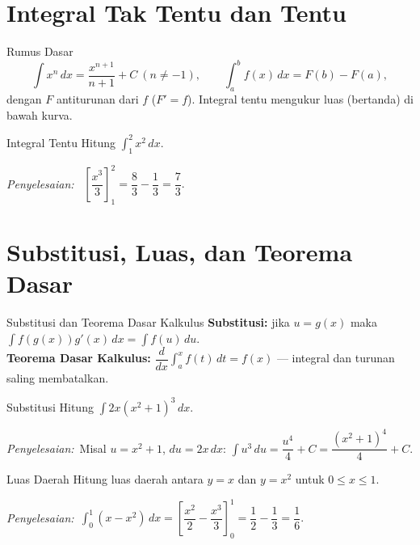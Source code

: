 \documentclass[11pt,a4paper]{report}
\theoremstyle{gaya}
\newcommand{\jawab}{\par\smallskip\noindent\textit{\textcolor{oranye}{Penyelesaian:}}\ }
\begin{document}
\section{Integral Tak Tentu dan Tentu}
\begin{konsep}{Rumus Dasar}
\[
\int x^n\,dx = \frac{x^{n+1}}{n+1}+C\ (n\neq-1), \qquad
\int_a^b f(x)\,dx = F(b)-F(a),
\]
dengan $F$ antiturunan dari $f$ ($F'=f$). Integral tentu mengukur luas (bertanda) di bawah kurva.
\end{konsep}

\begin{center}
\end{center}

\begin{contoh}{Integral Tentu}
Hitung $\displaystyle\int_1^2 x^2\,dx$.

\jawab
$\left[\dfrac{x^3}{3}\right]_1^2 = \dfrac{8}{3}-\dfrac{1}{3} = \dfrac{7}{3}.$
\end{contoh}

\section{Substitusi, Luas, dan Teorema Dasar}
\begin{konsep}{Substitusi dan Teorema Dasar Kalkulus}
\textbf{Substitusi:} jika $u=g(x)$ maka $\displaystyle\int f(g(x))g'(x)\,dx=\int f(u)\,du$.\\
\textbf{Teorema Dasar Kalkulus:} $\dfrac{d}{dx}\displaystyle\int_a^x f(t)\,dt=f(x)$ --- integral dan turunan saling membatalkan.
\end{konsep}

\begin{contoh}{Substitusi}
Hitung $\displaystyle\int 2x(x^2+1)^3\,dx$.

\jawab Misal $u=x^2+1$, $du=2x\,dx$: $\displaystyle\int u^3\,du=\dfrac{u^4}{4}+C=\dfrac{(x^2+1)^4}{4}+C.$
\end{contoh}

\begin{contoh}{Luas Daerah}
Hitung luas daerah antara $y=x$ dan $y=x^2$ untuk $0\le x\le1$.

\jawab $\displaystyle\int_0^1(x-x^2)\,dx=\left[\dfrac{x^2}{2}-\dfrac{x^3}{3}\right]_0^1=\dfrac12-\dfrac13=\dfrac16.$
\end{contoh}
\end{document}
